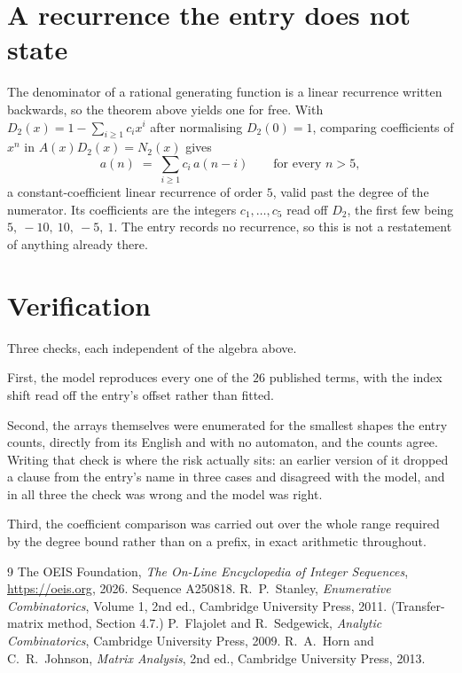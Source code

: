 \documentclass[11pt,a4paper]{article}
\theoremstyle{plain}
\theoremstyle{definition}
\begin{document}
\section{A recurrence the entry does not state}

The denominator of a rational generating function is a linear recurrence written backwards, so
the theorem above yields one for free. With $D_2(x)=1-\sum_{i\ge1}c_ix^i$ after normalising
$D_2(0)=1$, comparing coefficients of $x^n$ in $A(x)D_2(x)=N_2(x)$ gives
\[
a(n)\;=\;\sum_{i\ge1}c_i\,a(n-i)\qquad\text{for every }n>5,
\]
a constant-coefficient linear recurrence of order $5$, valid past the degree of the
numerator. Its coefficients are the integers $c_1,\dots,c_{5}$ read off $D_2$, the first few being $5,\ -10,\ 10,\ -5,\ 1$. The entry records no recurrence, so this is not a restatement of anything
already there.

\section{Verification}

Three checks, each independent of the algebra above.

First, the model reproduces every one of the $26$ published terms, with the index shift
read off the entry's offset rather than fitted.

Second, the arrays themselves were enumerated for the smallest shapes the entry counts,
directly from its English and with no automaton, and the counts agree. Writing that check is
where the risk actually sits: an earlier version of it dropped a clause from the entry's name
in three cases and disagreed with the model, and in all three the check was wrong and the model
was right.

Third, the coefficient comparison was carried out over the whole range required by the degree
bound rather than on a prefix, in exact arithmetic throughout.

\begin{thebibliography}{9}
 The OEIS Foundation, \emph{The On-Line Encyclopedia of Integer
Sequences}, \url{https://oeis.org}, 2026. Sequence A250818.
 R.~P.~Stanley, \emph{Enumerative Combinatorics}, Volume 1, 2nd ed.,
Cambridge University Press, 2011. (Transfer-matrix method, Section 4.7.)
 P.~Flajolet and R.~Sedgewick, \emph{Analytic Combinatorics}, Cambridge
University Press, 2009.
 R.~A.~Horn and C.~R.~Johnson, \emph{Matrix Analysis}, 2nd ed., Cambridge
University Press, 2013.
\end{thebibliography}
\end{document}

